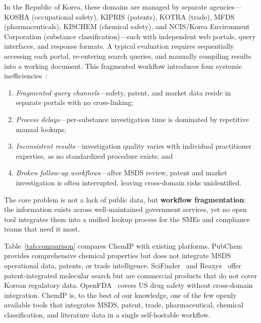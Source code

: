\documentclass[preprint,12pt]{elsarticle}
\begin{document}
In the Republic of Korea, these domains are managed by separate agencies---KOSHA (occupational safety), KIPRIS (patents), KOTRA (trade), MFDS (pharmaceuticals), KISCHEM (chemical safety), and NCIS/Korea Environment Corporation (substance classification)---each with independent web portals, query interfaces, and response formats.
A typical evaluation requires sequentially accessing each portal, re-entering search queries, and manually compiling results into a working document.
This fragmented workflow introduces four systemic inefficiencies~\cite{api_adoption_playbook}:
\begin{enumerate}
  \item \emph{Fragmented query channels}---safety, patent, and market data reside in separate portals with no cross-linking;
  \item \emph{Process delays}---per-substance investigation time is dominated by repetitive manual lookups;
  \item \emph{Inconsistent results}---investigation quality varies with individual practitioner expertise, as no standardized procedure exists; and
  \item \emph{Broken follow-up workflows}---after MSDS review, patent and market investigation is often interrupted, leaving cross-domain risks unidentified.
\end{enumerate}

The core problem is not a lack of public data, but \textbf{workflow fragmentation}: the information exists across well-maintained government services, yet no open tool integrates them into a unified lookup process for the SMEs and compliance teams that need it most.

Table~\ref{tab:comparison} compares ChemIP with existing platforms.
PubChem~\cite{pubchem_2023} provides comprehensive chemical properties but does not integrate MSDS operational data, patents, or trade intelligence.
SciFinder~\cite{scifinder} and Reaxys~\cite{reaxys} offer patent-integrated molecular search but are commercial products that do not cover Korean regulatory data.
OpenFDA~\cite{openfda} covers US drug safety without cross-domain integration.
ChemIP is, to the best of our knowledge, one of the few openly available tools that integrates MSDS, patent, trade, pharmaceutical, chemical classification, and literature data in a single self-hostable workflow.
\end{document}
